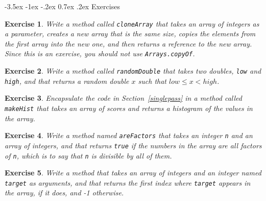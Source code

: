 \documentclass[12pt]{book}
\makeatletter
\theoremstyle{exercise}
\newtheorem{exercise}{Exercise}[chapter]
\newcommand{\java}[1]{\verb"#1"}
\renewcommand{\section}{\@startsection{section}{1}{\z@}%
    {-3.5ex \@plus -1ex \@minus -.2ex}%
    {0.7ex \@plus.2ex}%
    {\normalfont\Large\bfseries}}
\newcommand{\java}[1]{\lstinline{#1}} %
\makeatother
\begin{document}
\section{Exercises}


\begin{exercise}
Write a method called \java{cloneArray} that takes an array of integers as a parameter, creates a new array that is the same size, copies the elements from the first array into the new one, and then returns a reference to the new array.
Since this is an exercise, you should not use \java{Arrays.copyOf}.
\end{exercise}


\begin{exercise}
Write a method called \java{randomDouble} that takes two doubles, \java{low} and \java{high}, and that returns a random double $x$ such that $low \le x < high$.
\end{exercise}


\begin{exercise}
Encapsulate the code in Section~\ref{singlepass} in a method called \java{makeHist} that takes an array of scores and returns a histogram of the values in the array.
\end{exercise}


\begin{exercise}
Write a method named \java{areFactors} that takes an integer \java{n} and an array of integers, and that returns \java{true} if the numbers in the array are all factors of \java{n}, which is to say that \java{n} is divisible by all of them.
\end{exercise}


\begin{exercise}
Write a method that takes an array of integers and an integer named \java{target} as arguments, and that returns the first index where \java{target} appears in the array, if it does, and -1 otherwise.
\end{exercise}
\end{document}
